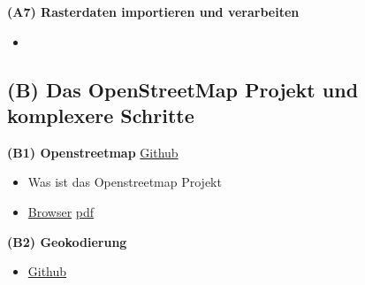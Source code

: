 \documentclass[ignorenonframetext,]{beamer}
\providecommand{\tightlist}{%
  \setlength{\itemsep}{0pt}\setlength{\parskip}{0pt}}
\begin{document}
\begin{frame}{\textbf{(A7) Rasterdaten importieren und verarbeiten}}
\protect\hypertarget{a7-rasterdaten-importieren-und-verarbeiten}{}

\begin{itemize}
\tightlist
\item
  \href{slides/Rasterdaten.Rmd}{}
\end{itemize}

\end{frame}

\hypertarget{b-das-openstreetmap-projekt-und-komplexere-schritte}{%
\subsection{\texorpdfstring{\textbf{(B) Das OpenStreetMap Projekt und
komplexere
Schritte}}{(B) Das OpenStreetMap Projekt und komplexere Schritte}}\label{b-das-openstreetmap-projekt-und-komplexere-schritte}}

\begin{frame}{\textbf{(B1) Openstreetmap}
\href{slides/OpenStreetMap.md}{Github}}
\protect\hypertarget{b1-openstreetmap-github}{}

\begin{itemize}
\item
  Was ist das Openstreetmap Projekt
\item
  \href{https://github.com/Japhilko/GeoData/blob/master/2017/slides/OpenStreetMap.md}{Browser}\textbar{}
  \href{slides/OpenStreetMap.pdf}{pdf}
\end{itemize}

\end{frame}

\begin{frame}{\textbf{(B2) Geokodierung}}
\protect\hypertarget{b2-geokodierung}{}

\begin{itemize}
\tightlist
\item
  \href{slides/Geokodierung.md}{Github}
\end{itemize}

\end{frame}
\end{document}
